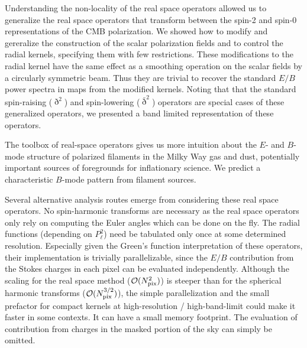 Understanding the non-locality of the real space operators allowed us to generalize the real space operators %
that transform between the spin-2 and spin-0 representations of the CMB polarization.
We showed how to modify and gereralize the construction of the scalar polarization fields and to control the radial kernels, specifying them with few restrictions.  These modifications to the radial kernel have the same effect as a smoothing operation on the scalar fields by a circularly symmetric beam.  Thus they are trivial to recover the standard $E/B$ power spectra in maps from the modified kernels. 
Noting that that the standard spin-raising ($\eth^2$) and spin-lowering ($\bar{\eth}^2$) operators are special cases of these generalized operators, we presented a band limited representation of these operators. 

The toolbox of real-space operators gives us more intuition about the $E$- and $B$-mode structure of polarized filaments in the Milky Way gas and dust, potentially important sources of foregrounds for inflationary science.  We predict a characteristic $B$-mode pattern from filament sources.


Several alternative analysis routes emerge from considering  these real space operators.  No spin-harmonic transforms are necessary as the real space operators only rely on computing the Euler angles which can be done on the fly.  The radial functions (depending on $P_{\ell}^{2}$) need be tabulated only once at some determined resolution.  Especially given the Green's function interpretation of these operators, their implementation is trivially parallelizable, since the $E/B$ contribution from the Stokes charges in each pixel can be evaluated independently.  Although the scaling for the real space method (${\cal O}(N_{\rm pix}^2)$) is steeper than for the spherical harmonic transforms (${\cal O}(N_{\rm pix}^{3/2})$), the simple parallelization and the small prefactor for compact kernels at high-resolution / high-band-limit could make it faster in some contexts.  It can have a small memory footprint.    The evaluation of contribution from charges in the masked portion of the sky can simply be omitted.  

